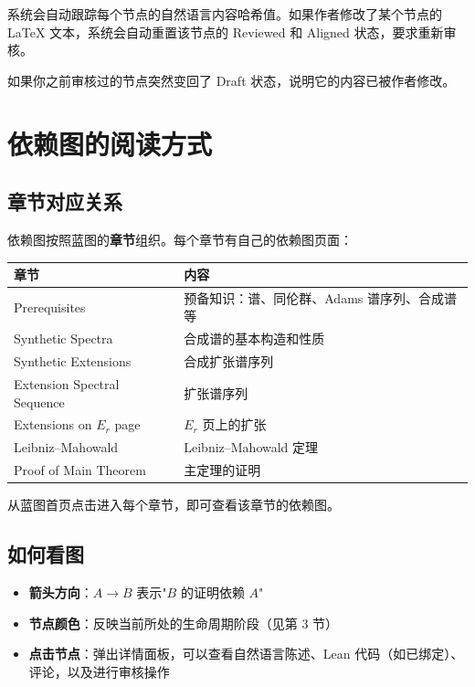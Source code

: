\documentclass[11pt,a4paper]{article}
\begin{document}
\begin{warnbox}[自动重置]
系统会自动跟踪每个节点的自然语言内容哈希值。如果作者修改了某个节点的 \LaTeX{} 文本，系统会自动重置该节点的 Reviewed 和 Aligned 状态，要求重新审核。

如果你之前审核过的节点突然变回了 Draft 状态，说明它的内容已被作者修改。
\end{warnbox}

\section{依赖图的阅读方式}

\subsection{章节对应关系}

依赖图按照蓝图的\textbf{章节}组织。每个章节有自己的依赖图页面：

\begin{center}
\renewcommand{\arraystretch}{1.3}
\begin{tabularx}{\textwidth}{lX}
\toprule
\textbf{章节} & \textbf{内容} \\
\midrule
Prerequisites & 预备知识：谱、同伦群、Adams 谱序列、合成谱等 \\
Synthetic Spectra & 合成谱的基本构造和性质 \\
Synthetic Extensions & 合成扩张谱序列 \\
Extension Spectral Sequence & 扩张谱序列 \\
Extensions on $E_r$ page & $E_r$ 页上的扩张 \\
Leibniz--Mahowald & Leibniz--Mahowald 定理 \\
Proof of Main Theorem & 主定理的证明 \\
\bottomrule
\end{tabularx}
\end{center}

从蓝图首页点击进入每个章节，即可查看该章节的依赖图。

\subsection{如何看图}

\begin{itemize}[nosep]
  \item \textbf{箭头方向}：$A \to B$ 表示"$B$ 的证明依赖 $A$"
  \item \textbf{节点颜色}：反映当前所处的生命周期阶段（见第 3 节）
  \item \textbf{点击节点}：弹出详情面板，可以查看自然语言陈述、Lean 代码（如已绑定）、评论，以及进行审核操作
\end{itemize}
\end{document}
